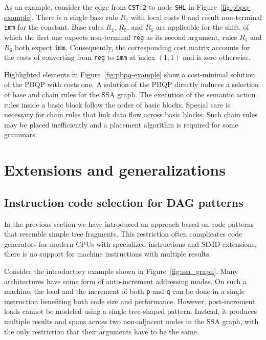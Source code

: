 As an example, consider the edge from \texttt{CST:2} to node
\texttt{SHL} in Figure~\ref{fig:pbpq-example}. There is a single base
rule $R_1$ with local costs 0 and result non-terminal \texttt{imm} for
the constant. Base rules $R_4$, $R_5$, and $R_6$ are applicable for
the shift, of which the first one expects non-terminal \texttt{reg} as
its second argument, rules $R_5$ and $R_6$ both expect
\texttt{imm}. Consequently, the corresponding cost matrix accounts for
the costs of converting from \texttt{reg} to \texttt{imm} at index
$(1,1)$ and is zero otherwise.

Highlighted elements in Figure~\ref{fig:pbpq-example} show a
cost-minimal solution of the PBQP with costs one. A solution of the
PBQP directly induces a selection of base and chain rules for the SSA
graph. The execution of the semantic action rules inside a basic block
follow the order of basic blocks. Special care is necessary for chain rules 
that link data flow across basic blocks. Such chain rules may be placed
inefficiently and a placement algorithm is required for
some grammars. 

\section{Extensions and generalizations}

\subsection{Instruction code selection for DAG patterns}
\label{sec:dag_patterns}
In the previous section we have introduced an approach based on code
patterns that resemble simple tree fragments. This restriction often
complicates code generators for modern CPUs with specialized
instructions and SIMD extensions, \eg there is no support for
machine instructions with multiple results.

Consider the introductory example shown
in Figure~\ref{fig:ssa_graph}. Many architectures have some form of
auto-increment addressing modes. On such a machine, the load and the
increment of both \texttt{p} and \texttt{q} can be done in a single
instruction benefiting both code size and performance. However,
post-increment loads cannot be modeled using a single tree-shaped
pattern. Instead, it produces multiple results and spans across two
non-adjacent nodes in the SSA graph, with the only restriction that
their arguments have to be the same.

